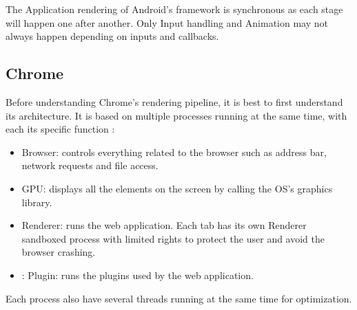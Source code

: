 \documentclass{kththesis}
\begin{document}
The Application rendering of Android's framework is synchronous as each stage will happen one after another. Only Input handling and Animation may not always happen depending on inputs and callbacks.

\subsection{Chrome}
Before understanding Chrome's rendering pipeline, it is best to first understand its architecture. It is based on multiple processes running at the same time, with each its specific function \cite{chrome_architecture}:
\begin{itemize}
    \item Browser: controls everything related to the browser such as address bar, network requests and file access.
    \item GPU: displays all the elements on the screen by calling the OS's graphics library.
    \item Renderer: runs the web application. Each tab has its own Renderer sandboxed process with limited rights to protect the user and avoid the browser crashing.
    \item: Plugin: runs the plugins used by the web application.
\end{itemize}

Each process also have several threads running at the same time for optimization.
\end{document}
